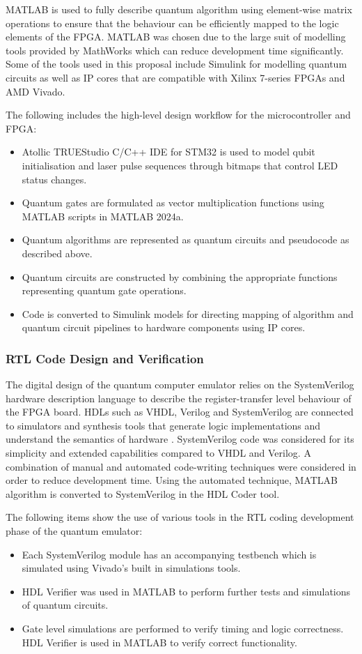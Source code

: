 MATLAB is used to fully describe quantum algorithm using element-wise matrix operations to ensure that the behaviour can be efficiently mapped to the logic elements of the FPGA. MATLAB was chosen due to the large suit of modelling tools provided by MathWorks which can reduce development time significantly. Some of the tools used in this proposal include Simulink for modelling quantum circuits as well as IP cores that are compatible with Xilinx 7-series FPGAs and AMD Vivado.

The following includes the high-level design workflow for the microcontroller and FPGA:
\begin{itemize}
	\item 
	Atollic TRUEStudio C/C++ IDE for STM32 is used to model qubit initialisation and laser pulse sequences through bitmaps that control LED status changes. 
	\item 
	Quantum gates are formulated as vector multiplication functions using MATLAB scripts in MATLAB 2024a.
	\item 
	Quantum algorithms are represented as quantum circuits and pseudocode as described above.
	\item 
	Quantum circuits are constructed by combining the appropriate functions representing quantum gate operations.
	\item 
	Code is converted to Simulink models for directing mapping of algorithm and quantum circuit pipelines to hardware components using IP cores.	
\end{itemize}

\subsubsection*{RTL Code Design and Verification}

The digital design of the quantum computer emulator relies on the SystemVerilog hardware description language to describe the register-transfer level behaviour of the FPGA board. HDLs such as VHDL, Verilog and SystemVerilog are connected to simulators and synthesis tools that generate logic implementations and understand the semantics of hardware \cite{wolf2004fpga}. SystemVerilog code was considered for its simplicity and extended capabilities compared to VHDL and Verilog. A combination of manual and automated code-writing techniques were considered in order to reduce development time. Using the automated technique, MATLAB algorithm is converted to SystemVerilog in the HDL Coder tool. 

The following items show the use of various tools in the RTL coding development phase of the quantum emulator:
\begin{itemize}
	\item 
	Each SystemVerilog module has an accompanying testbench which is simulated using Vivado's built in simulations tools.
	\item 
	HDL Verifier was used in MATLAB to perform further tests and simulations of quantum circuits.
	\item 
	Gate level simulations are performed to verify timing and logic correctness. HDL Verifier is used in MATLAB to verify correct functionality. 
\end{itemize}


